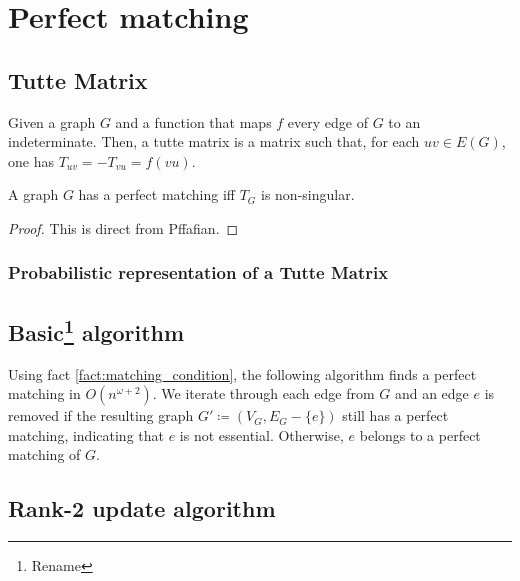 \chapter{Perfect matching}

\section{Tutte Matrix}

\begin{definition}[Indeterminates]

\end{definition}

\begin{definition}
    Given a graph \(G\) and a function that maps \(f\) every edge of \(G\) to an indeterminate.
    Then, a tutte matrix is a matrix such that, for each \(uv \in E(G)\), one has \(T_{uv} = -T_{vu} = f(vu)\).
\end{definition}

\begin{fact}
    \label{fact:matching_condition}
    A graph \(G\) has a perfect matching iff \(T_G\) is non-singular.
\end{fact}

\begin{proof}
    This is direct from Pffafian.
\end{proof}

\subsection{Probabilistic representation of a Tutte Matrix}

\section{Basic\footnote{Rename} algorithm}

Using fact \ref{fact:matching_condition}, the following algorithm finds a perfect matching in \(O(n^{\omega+2})\).
We iterate through each edge from \(G\) and 
an edge \(e\) is removed if the resulting graph \(G' \coloneqq (V_G, E_G - \{e\})\) still has a perfect matching, indicating that \(e\) is not essential.
Otherwise, \(e\) belongs to a perfect matching of \(G\).

\section{Rank-2 update algorithm}

